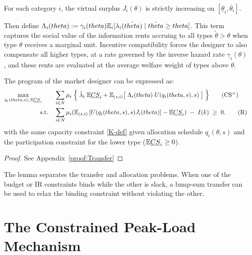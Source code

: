 \documentclass{class}
\begin{document}
\renewcommand{\theassumption}{Reg}
\begin{assumption}\label{ass:regularity}
For each category $i$, the virtual surplus $J_i(\theta)$ is strictly increasing on $[\underline{\theta}_i, \overline{\theta}_i]$.
\end{assumption}
\renewcommand{\theassumption}{\arabic{assumption}}

Then define $\Lambda_i(theta) := \gamma_i(theta)\mathbb{E}_i[\lambda_i(\tilde{theta}) \mid \tilde{theta} \ge theta]$. This term captures the social value of the information rents accruing to all types $\tilde\theta > \theta$ when type $\theta$ receives a marginal unit. Incentive compatibility forces the designer to also compensate all higher types, at a rate governed by the inverse hazard rate $\gamma_i(\theta)$, and these rents are evaluated at the average welfare weight of types above $\theta$.

\begin{lemma}\label{lem:Transfer}
The program of the market designer can be expressed as: 
\begin{align*}
\max_{q_i(theta,s), \, \mathbb{E} \underline{CS}_i}  \quad\quad 
&  \sum_{i \in N}  \mu_i   \; 
\Big\{ \;  \tilde{\lambda}_i \;\mathbb{E} \underline{CS}_i 
      + \mathbb{E}_{(s,i)} \big[\; \Lambda_i(theta)\;  U(q_i(theta,s),s)\; \big] \;  \Big\}
\tag{CS$^\times$}\label{CSmd-def}  \\
\text{s.t.} \quad
& \sum_{i\in N}\mu_i
(\mathbb{E}_{(s,i)}\left[ U(q_i(theta,s),s) J_i(theta) \right] - \mathbb{E} \underline{CS}_i)\;-\; I(k)
\;\ge\; 0. \tag{R}\label{Rmd-def}
\end{align*}
with the same capacity constraint \ref{K-def} given allocation schedule $q_i(\theta,s)$ and the participation constraint for the lower type ($\mathbb{E} \underline{CS}_i\ge 0$).
\end{lemma}
\begin{proof}
    See Appendix~\ref{proof:Transfer}
\end{proof}

The lemma separates the transfer and allocation problems. When one of the budget or IR constraints binds while the other is slack, a lump-sum transfer can be used to relax the binding constraint without violating the other. 



\section{The Constrained Peak-Load Mechanism}\label{sec4}
\end{document}
